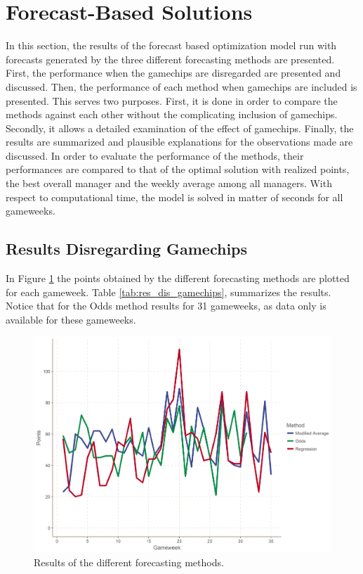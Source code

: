 \section{Forecast-Based Solutions}\label{sec:inexact}


In this section, the results of the forecast based optimization model run with forecasts generated by the three different forecasting methods are presented. First, the performance when the gamechips are disregarded are presented and discussed. Then, the performance of each method when gamechips are included is presented. This serves two purposes. First, it is done in order to compare the methods against each other without the complicating inclusion of gamechips. Secondly, it allows a detailed examination of the effect of gamechips. Finally, the results are summarized and plausible explanations for the observations made are discussed. In order to evaluate the performance of the methods, their performances are compared to that of the optimal solution with realized points, the best overall manager and the weekly average among all managers. With respect to computational time, the model is solved in matter of seconds for all gameweeks.

\newpage

\subsection{Results Disregarding Gamechips}

In Figure \ref{fig:res_comp_dis_gamechips} the points obtained by the different forecasting methods are plotted for each gameweek. Table \ref{tab:res_dis_gamechips}, summarizes the results. Notice that for the Odds method results for 31 gameweeks, as data only is available for these gameweeks.

\begin{figure}[H]
    \centering
    \includegraphics[scale=0.5]{fig/chapter_7/comparison_methods.png}
    \caption{Results of the different forecasting methods.}
\label{fig:res_comp_dis_gamechips}    
\end{figure}

